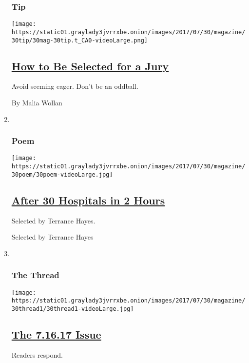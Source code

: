 \begin{enumerate}
{  \subsubsection{Tip}\label{tip}}

  \texttt{[image: https://static01.graylady3jvrrxbe.onion/images/2017/07/30/magazine/30tip/30mag-30tip.t\_CA0-videoLarge.png]}

  \hypertarget{how-to-be-selected-for-a-jury}{%
  \subsection{\texorpdfstring{\href{/2017/07/28/magazine/how-to-be-selected-for-a-jury.html}{How
  to Be Selected for a
  Jury}}{How to Be Selected for a Jury}}\label{how-to-be-selected-for-a-jury}}

  Avoid seeming eager. Don't be an oddball.

  By Malia Wollan
\item ~
  \hypertarget{poem}{%
  \subsubsection{Poem}\label{poem}}

  \texttt{[image: https://static01.graylady3jvrrxbe.onion/images/2017/07/30/magazine/30poem/30poem-videoLarge.jpg]}

  \hypertarget{after-30-hospitals-in-2-hours}{%
  \subsection{\texorpdfstring{\href{/2017/07/28/magazine/after-30-hospitals-in-2-hours.html}{After
  30 Hospitals in 2
  Hours}}{After 30 Hospitals in 2 Hours}}\label{after-30-hospitals-in-2-hours}}

  Selected by Terrance Hayes.

  Selected by Terrance Hayes
\item ~
  \hypertarget{the-thread}{%
  \subsubsection{The Thread}\label{the-thread}}

  \texttt{[image: https://static01.graylady3jvrrxbe.onion/images/2017/07/30/magazine/30thread1/30thread1-videoLarge.jpg]}

  \hypertarget{the-71617-issue}{%
  \subsection{\texorpdfstring{\href{/2017/07/28/magazine/the-7-16-17-issue.html}{The
  7.16.17 Issue}}{The 7.16.17 Issue}}\label{the-71617-issue}}

  Readers respond.
\end{enumerate}

